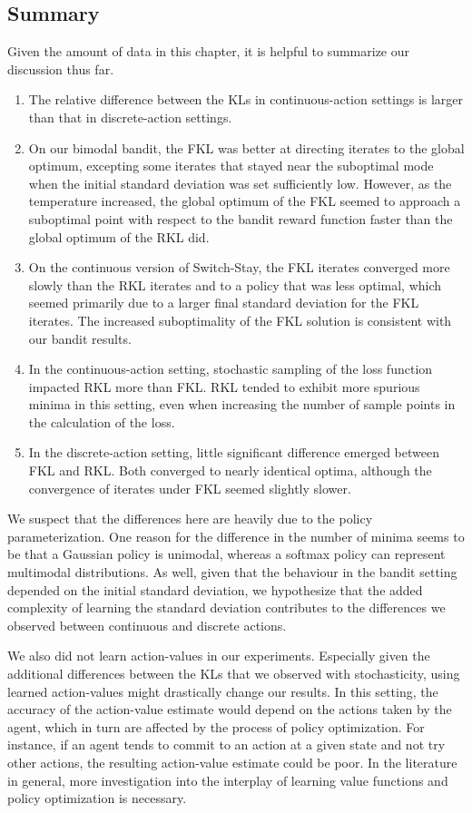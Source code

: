 \documentclass[twoside,11pt]{article}
\begin{document}
\subsection{Summary}
Given the amount of data in this chapter, it is helpful to summarize our discussion thus far. 
\begin{enumerate}
    \item The relative difference between the KLs in continuous-action settings is larger than that in discrete-action settings. 
    \item On our bimodal bandit, the FKL was better at directing iterates to the global optimum, excepting some iterates that stayed near the suboptimal mode when the initial standard deviation was set sufficiently low. However, as the temperature increased, the global optimum of the FKL seemed to approach a suboptimal point with respect to the bandit reward function faster than the global optimum of the RKL did. 
    \item On the continuous version of Switch-Stay, the FKL iterates converged more slowly than the RKL iterates and to a policy that was less optimal, which seemed primarily due to a larger final standard deviation for the FKL iterates. The increased suboptimality of the FKL solution is consistent with our bandit results. 
    \item In the continuous-action setting, stochastic sampling of the loss function impacted RKL more than FKL. RKL tended to exhibit more spurious minima in this setting, even when increasing the number of sample points in the calculation of the loss. 
    \item In the discrete-action setting, little significant difference emerged between FKL and RKL. Both converged to nearly identical optima, although the convergence of iterates under FKL seemed slightly slower. 
\end{enumerate}

We suspect that the differences here are heavily due to the policy parameterization. One reason for the difference in the number of minima seems to be that a Gaussian policy is unimodal, whereas a softmax policy can represent multimodal distributions. As well, given that the behaviour in the bandit setting depended on the initial standard deviation, we hypothesize that the added complexity of learning the standard deviation contributes to the differences we observed between continuous and discrete actions. 


We also did not learn action-values in our experiments. Especially given the additional differences between the KLs that we observed with stochasticity, using learned action-values might drastically change our results. In this setting, the accuracy of the action-value estimate would depend on the actions taken by the agent, which in turn are affected by the process of policy optimization. For instance, if an agent tends to commit to an action at a given state and not try other actions, the resulting action-value estimate could be poor. In the literature in general, more investigation into the interplay of learning value functions and policy optimization is necessary. 
\end{document}
